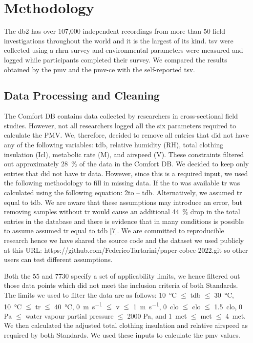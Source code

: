 
\section{Methodology}\label{sec:methodology}

    The \gls{db2} has over 107,000 independent recordings from more than 50 field investigations throughout the world and it is the largest of its kind.
    \Ac{tsv} were collected using a \gls{rhrn} survey and environmental parameters were measured and logged while participants completed their survey.
    We compared the results obtained by the \ac{pmv} and the \gls{pmv-ce} with the self-reported \ac{tsv}.

\subsection{Data Processing and Cleaning}\label{subsec:data-processing-and-cleaning}
The Comfort DB contains data collected by researchers in cross-sectional field studies.
However, not all researchers logged all the six parameters required to calculate the PMV.\@
We, therefore, decided to remove all entries that did not have any of the following variables: tdb, relative humidity (RH), total clothing insulation (Icl), metabolic rate (M), and airspeed (V).
These constraints filtered out approximately \qty{28}{\percent} of the data in the Comfort DB.\@
We decided to keep only entries that did not have \ac{tr} data.
However, since this is a required input, we used the following methodology to fill in missing data.
If the \ac{to} was available \ac{tr} was calculated using the following equation: 2to – tdb.
Alternatively, we assumed \ac{tr} equal to \ac{tdb}.
We are aware that these assumptions may introduce an error, but removing samples without \ac{tr} would cause an additional \qty{44}{\percent} drop in the total entries in the database and there is evidence that in many conditions is possible to assume assumed \ac{tr} equal to tdb [7].
We are committed to reproducible research hence we have shared the source code and the dataset we used publicly at this URL: https://github.com/FedericoTartarini/paper-cobee-2022.git so other users can test different assumptions.

Both the \gls{55} and \gls{7730} specify a set of applicability limits, we hence filtered out those data points which did not meet the inclusion criteria of both Standards.
The limits we used to filter the data are as follows: \qty{10}{\celsius} $\leq$ \ac{tdb} $\leq$ \qty{30}{\celsius}, \qty{10}{\celsius} $\leq$ \ac{tr} $\leq$ \qty{40}{\celsius}, \qty{0}{\m\per\s} $\leq$ \ac{v} $\leq$ \qty{1}{\m\per\s}, \qty{0}{clo} $\leq$ \ac{clo} $\leq$ \qty{1.5}{clo}, 0 Pa $\leq$ water vapour partial pressure $\leq$ 2000 Pa, and \qty{1}{met} $\leq$ \ac{met} $\leq$ \qty{4}{met}.
We then calculated the adjusted total clothing insulation and relative airspeed as required by both Standards.
We used these inputs to calculate the \ac{pmv} values.

